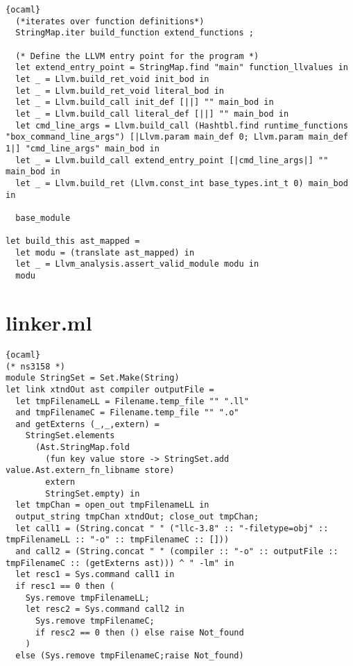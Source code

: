 \begin{lstlisting}{ocaml}
  (*iterates over function definitions*)
  StringMap.iter build_function extend_functions ;

  (* Define the LLVM entry point for the program *)
  let extend_entry_point = StringMap.find "main" function_llvalues in
  let _ = Llvm.build_ret_void init_bod in
  let _ = Llvm.build_ret_void literal_bod in
  let _ = Llvm.build_call init_def [||] "" main_bod in
  let _ = Llvm.build_call literal_def [||] "" main_bod in
  let cmd_line_args = Llvm.build_call (Hashtbl.find runtime_functions "box_command_line_args") [|Llvm.param main_def 0; Llvm.param main_def 1|] "cmd_line_args" main_bod in
  let _ = Llvm.build_call extend_entry_point [|cmd_line_args|] "" main_bod in
  let _ = Llvm.build_ret (Llvm.const_int base_types.int_t 0) main_bod in

  base_module

let build_this ast_mapped =
  let modu = (translate ast_mapped) in
  let _ = Llvm_analysis.assert_valid_module modu in
  modu
\end{lstlisting}
\section{linker.ml}
\begin{lstlisting}{ocaml}
(* ns3158 *)
module StringSet = Set.Make(String)
let link xtndOut ast compiler outputFile =
  let tmpFilenameLL = Filename.temp_file "" ".ll"
  and tmpFilenameC = Filename.temp_file "" ".o"
  and getExterns (_,_,extern) =
    StringSet.elements
      (Ast.StringMap.fold
        (fun key value store -> StringSet.add value.Ast.extern_fn_libname store)
        extern
        StringSet.empty) in
  let tmpChan = open_out tmpFilenameLL in
  output_string tmpChan xtndOut; close_out tmpChan;
  let call1 = (String.concat " " ("llc-3.8" :: "-filetype=obj" :: tmpFilenameLL :: "-o" :: tmpFilenameC :: []))
  and call2 = (String.concat " " (compiler :: "-o" :: outputFile :: tmpFilenameC :: (getExterns ast))) ^ " -lm" in
  let resc1 = Sys.command call1 in
  if resc1 == 0 then (
    Sys.remove tmpFilenameLL;
    let resc2 = Sys.command call2 in
      Sys.remove tmpFilenameC;
      if resc2 == 0 then () else raise Not_found
    )
  else (Sys.remove tmpFilenameC;raise Not_found)
\end{lstlisting}
